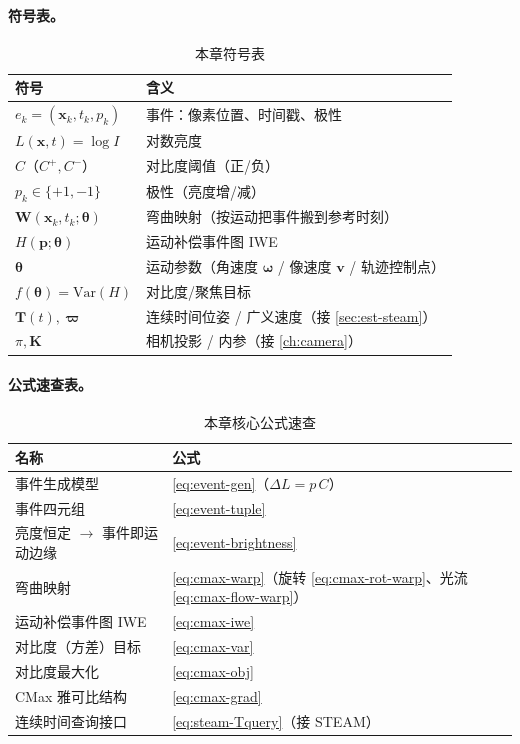 \paragraph{符号表。}
\begin{table}[H]\centering\small
\caption{本章符号表}
\begin{tabular}{ll}
\toprule
符号 & 含义 \\
\midrule
$e_k=(\mathbf x_k,t_k,p_k)$ & 事件：像素位置、时间戳、极性 \\
$L(\mathbf x,t)=\log I$ & 对数亮度 \\
$C$（$C^+,C^-$）& 对比度阈值（正/负） \\
$p_k\in\{+1,-1\}$ & 极性（亮度增/减） \\
$\mathbf W(\mathbf x_k,t_k;\boldsymbol\theta)$ & 弯曲映射（按运动把事件搬到参考时刻） \\
$H(\mathbf p;\boldsymbol\theta)$ & 运动补偿事件图 IWE \\
$\boldsymbol\theta$ & 运动参数（角速度 $\boldsymbol\omega$ / 像速度 $\mathbf v$ / 轨迹控制点） \\
$f(\boldsymbol\theta)=\mathrm{Var}(H)$ & 对比度/聚焦目标 \\
$\mathbf T(t),\boldsymbol\varpi$ & 连续时间位姿 / 广义速度（接 \cref{sec:est-steam}） \\
$\pi,\mathbf K$ & 相机投影 / 内参（接 \cref{ch:camera}） \\
\bottomrule
\end{tabular}
\end{table}

\paragraph{公式速查表。}
\begin{table}[H]\centering\small
\caption{本章核心公式速查}
\begin{tabular}{ll}
\toprule
名称 & 公式 \\
\midrule
事件生成模型 & \cref{eq:event-gen}（$\Delta L=p\,C$）\\
事件四元组 & \cref{eq:event-tuple} \\
亮度恒定 $\to$ 事件即运动边缘 & \cref{eq:event-brightness} \\
弯曲映射 & \cref{eq:cmax-warp}（旋转 \cref{eq:cmax-rot-warp}、光流 \cref{eq:cmax-flow-warp}）\\
运动补偿事件图 IWE & \cref{eq:cmax-iwe} \\
对比度（方差）目标 & \cref{eq:cmax-var} \\
对比度最大化 & \cref{eq:cmax-obj} \\
CMax 雅可比结构 & \cref{eq:cmax-grad} \\
连续时间查询接口 & \cref{eq:steam-Tquery}（接 STEAM）\\
\bottomrule
\end{tabular}
\end{table}

